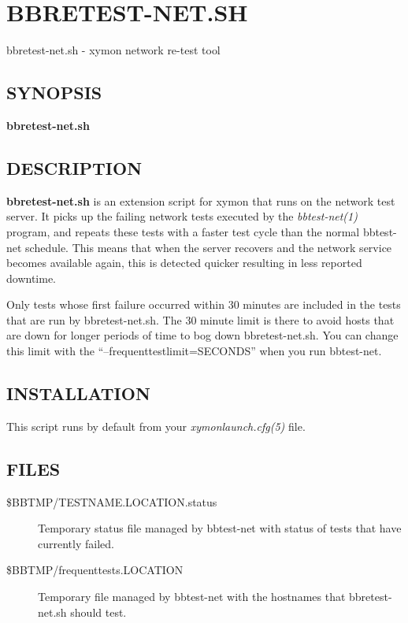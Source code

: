 %
\newpage
\section{BBRETEST-NET.SH}

 bbretest-net.sh - xymon network re-test tool

 \subsection{SYNOPSIS}
\textbf{bbretest-net.sh}


 
\subsection{DESCRIPTION}
\textbf{bbretest-net.sh}
 is an extension script for xymon that runs on the network test
 server. It picks up the failing network tests executed by the
 \emph{bbtest-net(1)} program, and repeats these tests with a faster
 test cycle than the normal bbtest-net schedule. This means that when
 the server recovers and the network service becomes available again,
 this is detected quicker resulting in less reported downtime. 


  Only tests whose first failure occurred within 30 minutes are
  included in the tests that are run by bbretest-net.sh. The 30 minute
  limit is there to avoid hosts that are down for longer periods of
  time to bog down bbretest-net.sh. You can change this limit with the
  ``--frequenttestlimit=SECONDS'' when you run bbtest-net. 



 


 
\subsection{INSTALLATION}
 This script runs by default from your \emph{xymonlaunch.cfg(5)}
 file. 

 


 
\subsection{FILES}
\begin{description}
\item[\$BBTMP/TESTNAME.LOCATION.status] Temporary status file managed
  by bbtest-net with status of tests that have currently failed. 

\item[\$BBTMP/frequenttests.LOCATION] Temporary file managed by
  bbtest-net with the hostnames that bbretest-net.sh should test. 


 


\end{description}
